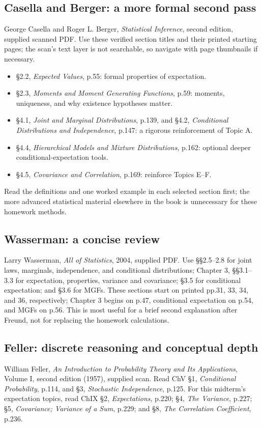 \subsection{Casella and Berger: a more formal second pass}
George Casella and Roger L. Berger, \emph{Statistical Inference}, second edition, supplied scanned PDF. Use these verified section titles and their printed starting pages; the scan's text layer is not searchable, so navigate with page thumbnails if necessary.
\begin{itemize}
\item \S2.2, \emph{Expected Values}, p.55: formal properties of expectation.
\item \S2.3, \emph{Moments and Moment Generating Functions}, p.59: moments, uniqueness, and why existence hypotheses matter.
\item \S4.1, \emph{Joint and Marginal Distributions}, p.139, and \S4.2, \emph{Conditional Distributions and Independence}, p.147: a rigorous reinforcement of Topic A.
\item \S4.4, \emph{Hierarchical Models and Mixture Distributions}, p.162: optional deeper conditional-expectation tools.
\item \S4.5, \emph{Covariance and Correlation}, p.169: reinforce Topics E--F.
\end{itemize}
Read the definitions and one worked example in each selected section first; the more advanced statistical material elsewhere in the book is unnecessary for these homework methods.

\subsection{Wasserman: a concise review}
Larry Wasserman, \emph{All of Statistics}, 2004, supplied PDF. Use \S\S2.5--2.8 for joint laws, marginals, independence, and conditional distributions; Chapter 3, \S\S3.1--3.3 for expectation, properties, variance and covariance; \S3.5 for conditional expectation; and \S3.6 for MGFs. These sections start on printed pp.31, 33, 34, and 36, respectively; Chapter 3 begins on p.47, conditional expectation on p.54, and MGFs on p.56. This is most useful for a brief second explanation after Freund, not for replacing the homework calculations.

\subsection{Feller: discrete reasoning and conceptual depth}
William Feller, \emph{An Introduction to Probability Theory and Its Applications}, Volume I, second edition (1957), supplied scan. Read ChV \S1, \emph{Conditional Probability}, p.114, and \S3, \emph{Stochastic Independence}, p.125. For this midterm's expectation topics, read ChIX \S2, \emph{Expectations}, p.220; \S4, \emph{The Variance}, p.227; \S5, \emph{Covariance; Variance of a Sum}, p.229; and \S8, \emph{The Correlation Coefficient}, p.236.

